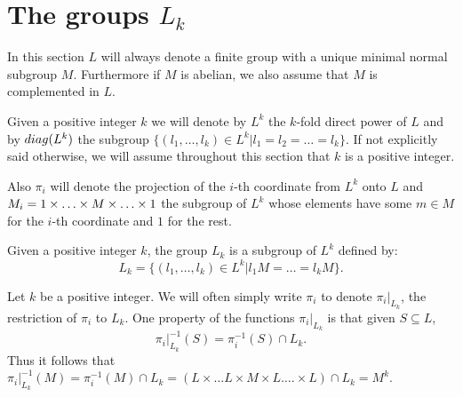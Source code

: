 \chapter{The groups \texorpdfstring{$L_k$}{Lk}} \label{TheGroupsLk}

In this section $L$ will always denote a finite group with a unique minimal normal subgroup $M$. Furthermore if $M$ is abelian, we also assume that $M$ is complemented in $L$.

Given a positive integer $k$ we will denote by $L^{k}$ the $k$-fold direct power of $L$ and by $diag({L^{k}})$ the subgroup $\{(l_1,\ldots ,l_k) \in L^k | l_1 = l_2 = \ldots  = l_k\}$. If not explicitly said otherwise, we will assume throughout this section that $k$ is a positive integer.

Also $\pi_i$ will denote the projection of the $i$-th coordinate from $L^k$ onto $L$ and $M_{i} = 1\times \ldots  \times M \times \ldots  \times 1$ the subgroup of $L^k$ whose elements have some $m \in M$ for the $i$-th coordinate and $1$ for the rest.

\begin{definition}
    Given a positive integer $k$, the group $L_k$ is a subgroup of $L^{k}$ defined by:
    $$
    L_k = \{ (l_1,\ldots ,l_k) \in L^k | l_1M = \ldots  = l_kM \}.
    $$
\end{definition}

Let $k$ be a positive integer.
We will often simply write $\pi_i$ to denote $\pi_i|_{L_k}$, the restriction of $\pi_i$ to $L_k$. One property of the functions $\pi_i|_{L_k}$ is that given $S \subseteq L$,
$$
\pi_i|_{L_k}^{-1}(S) = \pi_i^{-1}(S) \cap L_k.
$$
Thus it follows that $\pi_i|_{L_k}^{-1}(M) = \pi_i^{-1}(M) \cap L_k = (L \times \ldots  L \times M \times L \ldots . \times L) \cap L_k = M^k$.








